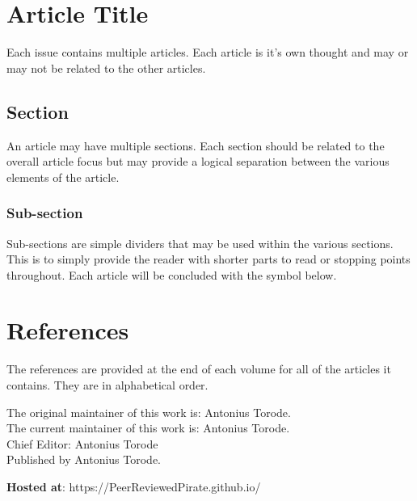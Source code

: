 \begin{framed}[.5\textwidth]
	\begin{minipage}{\linewidth}
		\section*{Article Title}
		Each issue contains multiple articles. Each article is it's own thought and may or may not be related to the other articles.
		
		\hspace{1em}\subsection*{Section}
		
		An article may have multiple sections. Each section should be related to the overall article focus but may provide a logical separation between the various elements of the article.
		
		\hspace{1em}\subsubsection*{Sub-section}
		
		Sub-sections are simple dividers that may be used within the various sections. This is to simply provide the reader with shorter parts to read or stopping points throughout. Each article will be concluded with the symbol below.
		
		\sectionEnd
		
		\section*{References}
		The references are provided at the end of each volume for all of the articles it contains. They are in alphabetical order.
	\end{minipage}
\end{framed}


	\vspace{1cm}
		
	The original maintainer of this work is: Antonius Torode. \\		
	The current maintainer of this work is: Antonius Torode. \\
	Chief Editor: Antonius Torode\\		 		
	Published by Antonius Torode. 
	
	\textbf{Hosted at}: https://PeerReviewedPirate.github.io/
	
